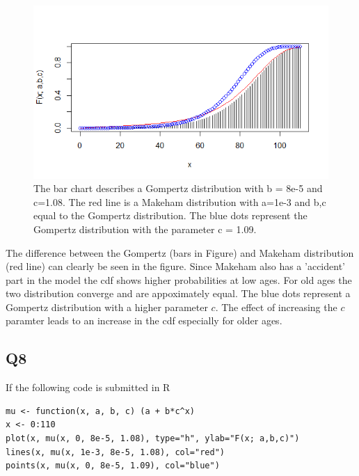 \documentclass[11pt]{article}
\begin{document}
\begin{center}
\begin{figure}

\includegraphics[scale=1]{Question_7_MakehamGompertz.png}

\caption{The bar chart describes a Gompertz distribution with b = 8e-5 and c=1.08. The red line is a 
Makeham distribution with a=1e-3 and b,c equal to the Gompertz distribution. The blue dots represent
the Gompertz distribution with the parameter c = 1.09.}
\label{Figure_Question7}

\end{figure}
\end{center}

The difference between the Gompertz (bars in Figure) and Makeham distribution (red line) can clearly be seen in the figure. Since Makeham also has a 'accident' part in the model the cdf shows higher probabilities at low ages. For old ages the two distribution converge and are appoximately equal. The blue dots represent a Gompertz distribution with a higher parameter $c$. The effect of increasing the $c$ paramter leads to an increase in the cdf especially for older ages.


\subsection*{Q8}

If the following code is submitted in R

\begin{verbatim}
mu <- function(x, a, b, c) (a + b*c^x)
x <- 0:110
plot(x, mu(x, 0, 8e-5, 1.08), type="h", ylab="F(x; a,b,c)")
lines(x, mu(x, 1e-3, 8e-5, 1.08), col="red")
points(x, mu(x, 0, 8e-5, 1.09), col="blue")
\end{verbatim}
\end{document}
